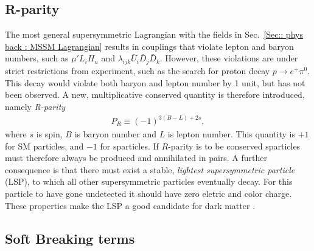 \documentclass[twoside,english]{uiofysmaster}
\begin{document}
{\subsection{R-parity}\label{Sec:: phys back : R-parity}

The most general supersymmetric Lagrangian with the fields in Sec.~\ref{Sec:: phys back : MSSM Lagrangian} results in couplings that violate lepton and baryon numbers, such as $\mu' L_i H_u$ and $ \lambda_{ijk} \bar{U}_i \bar{D}_j \bar{D}_k $. However, these violations are under strict restrictions from experiment, such as the search for proton decay $p \rightarrow e^+ \pi^0$. This decay would violate both baryon and lepton number by 1 unit, but has not been observed. A new, multiplicative conserved quantity is therefore introduced, namely \textit{R-parity}
\begin{align}\label{Eq:: R-parity}
P_R \equiv (-1)^{3(B-L) +2s},
\end{align}
where $s$ is spin, $B$ is baryon number and $L$ is lepton number. This quantity is $+1$ for SM particles, and $-1$ for sparticles. If $R$-parity is to be conserved sparticles must therefore always be produced and annihilated in pairs. A further consequence is that there must exist a stable, \textit{lightest supersymmetric particle} (LSP), to which all other supersymmetric particles eventually decay. For this particle to have gone undetected it should have zero eletric and color charge. These properties make the LSP a good candidate for dark matter \cite{weinberg_1995}.

\subsection{Soft Breaking terms}

}
\end{document}
